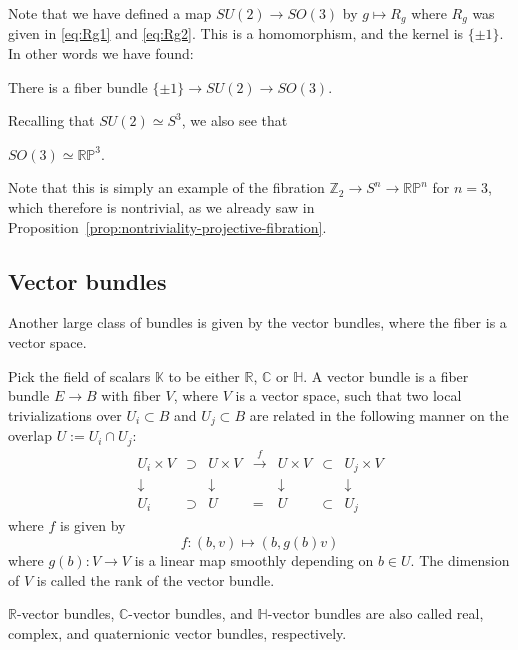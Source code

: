 \documentclass[12pt]{article}
\numberwithin{equation}{section}
\theoremstyle{remark}
\def\bC{\mathbb{C}}
\def\bH{\mathbb{H}}
\def\bK{\mathbb{K}}
\def\bR{\mathbb{R}}
\def\bZ{\mathbb{Z}}
\def\RP{\mathbb{RP}}
\begin{document}
Note that we have defined a map $SU(2)\to SO(3)$ by $g\mapsto R_g$ where $R_g$ was given in \eqref{eq:Rg1} and \eqref{eq:Rg2}.
This is a homomorphism, and the kernel is $\{\pm 1\}$.
In other words we have found:
\begin{example}
  There is a fiber bundle $
    \{\pm 1\} \to SU(2) \to SO(3). 
  $
\end{example}
Recalling that $SU(2)\simeq S^3$, we also see that 
\begin{proposition}
$SO(3)\simeq \RP^3$.  
\end{proposition}

Note that this is simply an example of the fibration $\bZ_2\to S^n\to \RP^n$
for $n=3$,
which therefore is nontrivial, as we already saw in Proposition~\ref{prop:nontriviality-projective-fibration}.

\subsection{Vector bundles}

Another large class of bundles is given by the vector bundles,
where the fiber is a vector space.

\begin{definition}
  Pick the field of scalars $\bK$ to be either $\bR$, $\bC$ or $\bH$.
  A vector bundle is a fiber bundle $E\to B$ with fiber $V$,
  where $V$ is a vector space, such that two local trivializations over $U_i \subset B$
  and $U_j\subset B$ are related in the following manner on the overlap $U:=U_i\cap U_j$:
  \begin{equation}
  \begin{array}{cccccccc}
    U_i \times V &\supset& U \times V & \xrightarrow{f } & 
    U \times V & \subset & U_j\times V \\
    \downarrow & & \downarrow & & \downarrow & & \downarrow \\
    U_i & \supset & U  & = & U  & \subset & U_j
  \end{array}
  \end{equation}
  where $f $ is given by \begin{equation}
    f : (b,v) \mapsto (b, g (b) v)
    \label{eq:vec-bundle-transition-functions}
  \end{equation} where $g (b): V\to V$ is a linear map smoothly depending on $b\in U$.
  The dimension of $V$ is called the rank of the vector bundle.
\end{definition}
$\bR$-vector bundles, $\bC$-vector bundles, and $\bH$-vector bundles
are also called real, complex, and quaternionic vector bundles, respectively.
\end{document}
